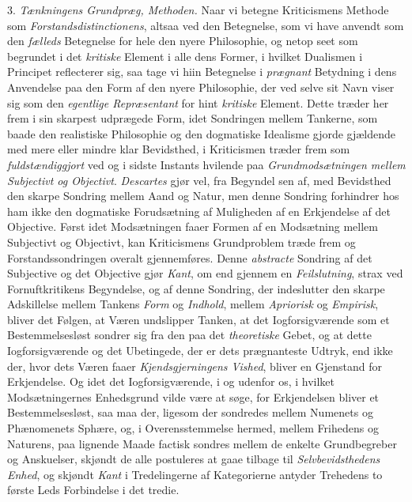 3. \emph{Tænkningens Grundpræg, Methoden.} Naar vi
betegne Kriticismens Methode som \emph{Forstandsdistinctionens},
altsaa ved den Betegnelse, som vi have anvendt som
den \emph{fælleds} Betegnelse for hele den nyere Philosophie, og
netop seet som begrundet i det \emph{kritiske} Element i alle dens
Former, i hvilket Dualismen i Principet reflecterer sig, saa
tage vi hiin Betegnelse i \emph{prægnant} Betydning i dens Anvendelse
paa den Form af den nyere Philosophie, der ved selve
sit Navn viser sig som den \emph{egentlige Repræsentant} for
hint \emph{kritiske} Element. Dette træder her frem i sin skarpest
udprægede Form, idet Sondringen mellem Tankerne, som baade
den realistiske Philosophie og den dogmatiske Idealisme gjorde
gjældende med mere eller mindre klar Bevidsthed, i Kriticismen
træder frem som \emph{fuldstændiggjort} ved og i sidste
Instants hvilende paa \emph{Grundmodsætningen mellem Subjectivt
og Objectivt}. \emph{Descartes} gjør vel, fra Begyndel
 sen af, med Bevidsthed den skarpe Sondring mellem Aand og
Natur, men denne Sondring forhindrer hos ham ikke den dogmatiske
Forudsætning af Muligheden af en Erkjendelse af det
Objective. Først idet Modsætningen faaer Formen af en Modsætning
mellem Subjectivt og Objectivt, kan Kriticismens Grundproblem
træde frem og Forstandssondringen overalt gjennemføres.
Denne \emph{abstracte} Sondring af det Subjective og det
Objective gjør \emph{Kant}, om end gjennem en \emph{Feilslutning},
strax ved Fornuftkritikens Begyndelse, og af denne Sondring,
der indeslutter den skarpe Adskillelse mellem Tankens \emph{Form}
og \emph{Indhold}, mellem \emph{Apriorisk} og \emph{Empirisk}, bliver det Følgen,
at Væren undslipper Tanken, at det Iogforsigværende som
et Bestemmelsesløst sondrer sig fra den paa det \emph{theoretiske}
Gebet, og at dette Iogforsigværende og det Ubetingede, der er
dets prægnanteste Udtryk, end ikke der, hvor dets Væren faaer
\emph{Kjendsgjerningens Vished}, bliver en Gjenstand for Erkjendelse.
Og idet det Iogforsigværende, i og udenfor os, i
hvilket Modsætningernes Enhedsgrund vilde være at søge, for
Erkjendelsen bliver et Bestemmelsesløst, saa maa der, ligesom
der sondredes mellem Numenets og Phænomenets Sphære, og,
i Overensstemmelse hermed, mellem Frihedens og Naturens,
paa lignende Maade factisk sondres mellem de enkelte Grundbegreber
og Anskuelser, skjøndt de alle postuleres at gaae tilbage
til \emph{Selvbevidsthedens Enhed}, og skjøndt \emph{Kant} i
Tredelingerne af Kategorierne antyder Trehedens to første Leds
Forbindelse i det tredie.

